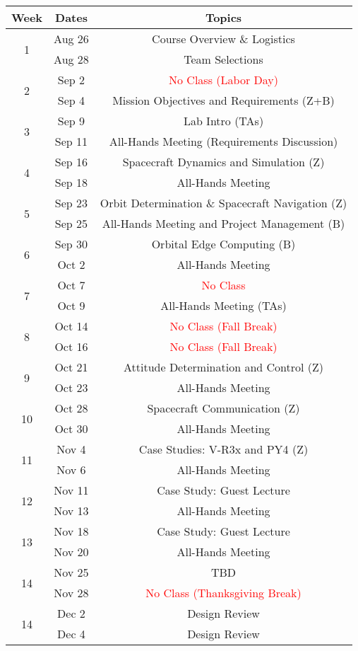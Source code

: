 \documentclass[11pt,letterpaper]{article}
\begin{document}
\begin{tabular}{c|c|c}
	Week & Dates & Topics \\
	\hline
	\multirow{2}{*}{1} & Aug 26 & Course Overview \& Logistics \\
	 & Aug 28 & Team Selections \\
	\hline
	\multirow{2}{*}{2} & Sep 2 & \textcolor{red}{No Class (Labor Day)} \\
	 & Sep 4 & Mission Objectives and Requirements (Z+B) \\
	\hline
	\multirow{2}{*}{3}  & Sep 9 & Lab Intro (TAs) \\
	 & Sep 11 & All-Hands Meeting (Requirements Discussion) \\
	\hline
	\multirow{2}{*}{4}  & Sep 16 & Spacecraft Dynamics and Simulation (Z)\\
	 & Sep 18 & All-Hands Meeting \\
	\hline
	\multirow{2}{*}{5}  & Sep 23 & Orbit Determination \& Spacecraft Navigation (Z) \\
	 & Sep 25 & All-Hands Meeting and Project Management (B)\\
	\hline
	\multirow{2}{*}{6}  & Sep 30 & Orbital Edge Computing (B) \\
	 & Oct 2 & All-Hands Meeting \\
	\hline
	\multirow{2}{*}{7}  & Oct 7 & \textcolor{red}{No Class} \\
	 & Oct 9 & All-Hands Meeting (TAs) \\
	\hline
	\multirow{2}{*}{8}  & Oct 14 & \textcolor{red}{No Class (Fall Break)} \\
	 & Oct 16 & \textcolor{red}{No Class (Fall Break)} \\
	\hline
	\multirow{2}{*}{9}  & Oct 21 & Attitude Determination and Control (Z) \\
	 & Oct 23 & All-Hands Meeting \\
	\hline
	\multirow{2}{*}{10}  & Oct 28 & Spacecraft Communication (Z) \\
	 & Oct 30 & All-Hands Meeting \\
	 \hline
	\multirow{2}{*}{11}  & Nov 4 &  Case Studies: V-R3x and PY4 (Z) \\
	 & Nov 6 & All-Hands Meeting \\
	 \hline
	\multirow{2}{*}{12}  & Nov 11 & Case Study: Guest Lecture \\
	 & Nov 13 & All-Hands Meeting \\
	 \hline
	\multirow{2}{*}{13}  & Nov 18 & Case Study: Guest Lecture \\
	 & Nov 20 & All-Hands Meeting \\
	 \hline
	\multirow{2}{*}{14}  & Nov 25 & TBD \\
	 & Nov 28 & \textcolor{red}{No Class (Thanksgiving Break)} \\
	 \hline
	\multirow{2}{*}{14}  & Dec 2 & Design Review \\
	 & Dec 4 & Design Review \\
\end{tabular}
\end{document}

